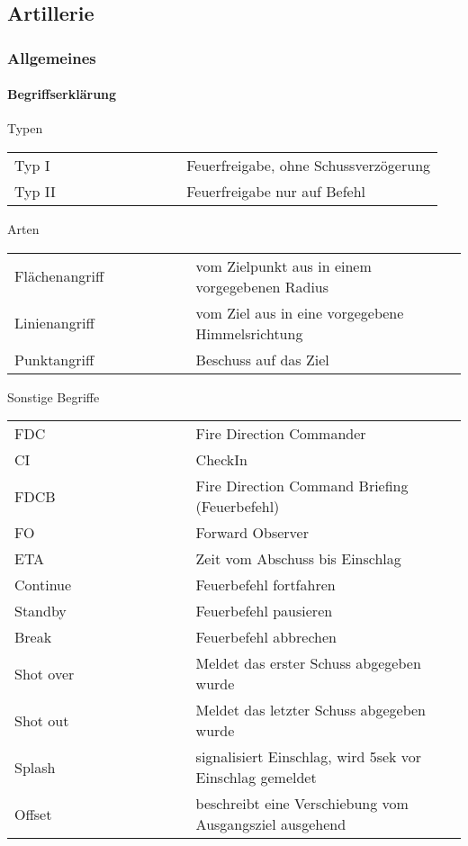 \subsection{Artillerie}
\subsubsection{Allgemeines}
\paragraph{Begriffserklärung}
	Typen
	\begin{longtable}{p{0.4\linewidth} p{0.6\linewidth} }
		Typ I 		& 		Feuerfreigabe, ohne Schussverzögerung \\
		Typ II 		&		Feuerfreigabe nur auf Befehl \\
	\end{longtable}

	Arten
	\begin{longtable}{p{0.4\linewidth} p{0.6\linewidth} }
		Flächenangriff 	&	vom Zielpunkt aus in einem vorgegebenen Radius \\
		Linienangriff 		&	vom Ziel aus in eine vorgegebene Himmelsrichtung \\
		Punktangriff 		&	Beschuss auf das Ziel \\
	\end{longtable}

	Sonstige Begriffe

	\begin{longtable}{p{0.4\linewidth} p{0.6\linewidth} }
		FDC 		&		Fire Direction Commander \\
		CI  		&		CheckIn \\
		FDCB 		&		Fire Direction Command Briefing (Feuerbefehl) \\
		FO  		&		Forward Observer \\
		ETA  		&		Zeit vom Abschuss bis Einschlag \\
		Continue 	&		Feuerbefehl fortfahren \\
		Standby 	&		Feuerbefehl pausieren \\
		Break  	&		Feuerbefehl abbrechen \\
		Shot over  	&		Meldet das erster Schuss abgegeben wurde \\
		Shot out  	&		Meldet das letzter Schuss abgegeben wurde \\
		Splash  	&		signalisiert Einschlag, wird 5sek vor Einschlag gemeldet \\
		Offset  	&		beschreibt eine Verschiebung vom Ausgangsziel ausgehend \\
	\end{longtable}

